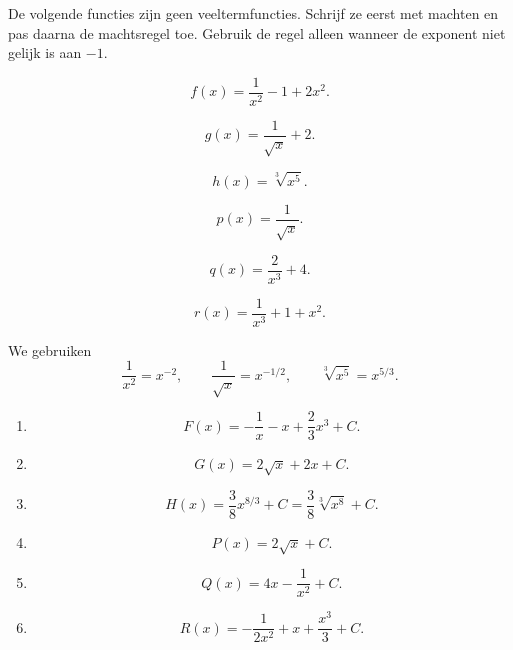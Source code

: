\documentclass{ximera}
\begin{document}
\begin{oefening}{\oefU}

De volgende functies zijn geen veeltermfuncties. Schrijf ze eerst met machten en pas daarna de machtsregel toe. Gebruik de regel alleen wanneer de exponent niet gelijk is aan $-1$.

\begin{question}
\[
f(x)=\frac{1}{x^2}-1+2x^2.
\]
\end{question}

\begin{question}
\[
g(x)=\frac{1}{\sqrt{x}}+2.
\]
\end{question}

\begin{question}
\[
h(x)=\sqrt[3]{x^5}.
\]
\end{question}

\begin{question}
\[
p(x)=\frac{1}{\sqrt{x}}.
\]
\end{question}

\begin{question}
\[
q(x)=\frac{2}{x^3}+4.
\]
\end{question}

\begin{question}
\[
r(x)=\frac{1}{x^3}+1+x^2.
\]
\end{question}

\begin{oplossing}

We gebruiken
\[
\frac1{x^2}=x^{-2},
\qquad
\frac1{\sqrt{x}}=x^{-1/2},
\qquad
\sqrt[3]{x^5}=x^{5/3}.
\]

\begin{enumerate}
\item
\[
F(x)=-\frac1x-x+\frac23x^3+C.
\]

\item
\[
G(x)=2\sqrt{x}+2x+C.
\]

\item
\[
H(x)=\frac38x^{8/3}+C
=\frac38\sqrt[3]{x^8}+C.
\]

\item
\[
P(x)=2\sqrt{x}+C.
\]

\item
\[
Q(x)=4x-\frac1{x^2}+C.
\]

\item
\[
R(x)=-\frac1{2x^2}+x+\frac{x^3}{3}+C.
\]
\end{enumerate}

\end{oplossing}

\end{oefening}
\end{document}
